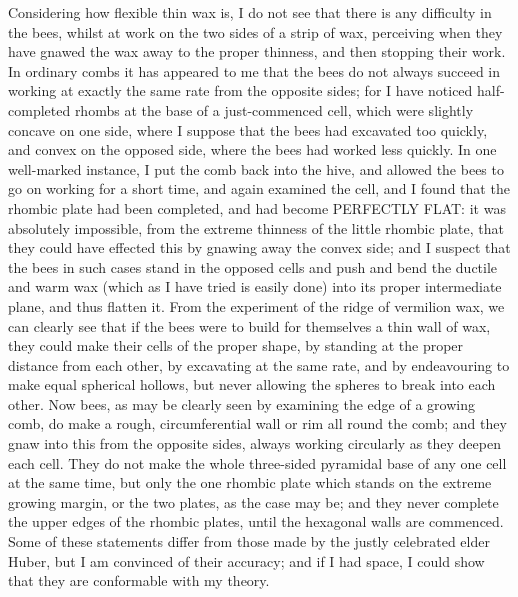 Considering how flexible thin wax is, I do not see that there is any difficulty in the bees, whilst at work on the two sides of a strip of wax, perceiving when they have gnawed the wax away to the proper thinness, and then stopping their work. In ordinary combs it has appeared to me that the bees do not always succeed in working at exactly the same rate from the opposite sides; for I have noticed half-completed rhombs at the base of a just-commenced cell, which were slightly concave on one side, where I suppose that the bees had excavated too quickly, and convex on the opposed side, where the bees had worked less quickly. In one well-marked instance, I put the comb back into the hive, and allowed the bees to go on working for a short time, and again examined the cell, and I found that the rhombic plate had been completed, and had become PERFECTLY FLAT: it was absolutely impossible, from the extreme thinness of the little rhombic plate, that they could have effected this by gnawing away the convex side; and I suspect that the bees in such cases stand in the opposed cells and push and bend the ductile and warm wax (which as I have tried is easily done) into its proper intermediate plane, and thus flatten it.
From the experiment of the ridge of vermilion wax, we can clearly see that if the bees were to build for themselves a thin wall of wax, they could make their cells of the proper shape, by standing at the proper distance from each other, by excavating at the same rate, and by endeavouring to make equal spherical hollows, but never allowing the spheres to break into each other. Now bees, as may be clearly seen by examining the edge of a growing comb, do make a rough, circumferential wall or rim all round the comb; and they gnaw into this from the opposite sides, always working circularly as they deepen each cell. They do not make the whole three-sided pyramidal base of any one cell at the same time, but only the one rhombic plate which stands on the extreme growing margin, or the two plates, as the case may be; and they never complete the upper edges of the rhombic plates, until the hexagonal walls are commenced. Some of these statements differ from those made by the justly celebrated elder Huber, but I am convinced of their accuracy; and if I had space, I could show that they are conformable with my theory.
